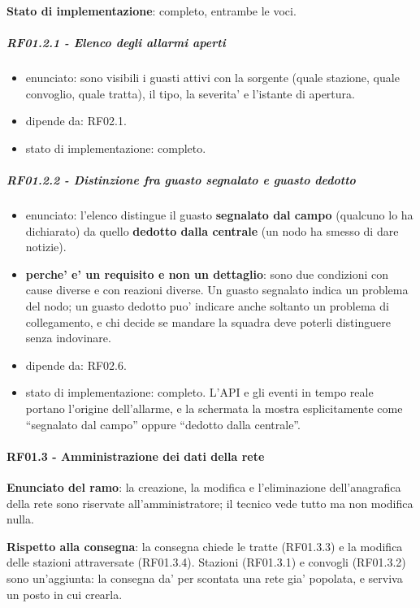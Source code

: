 \documentclass[11pt]{article}
\begin{document}
\textbf{Stato di implementazione}: completo, entrambe le voci.
\subparagraph{RF01.2.1 - Elenco degli allarmi aperti}
\label{sec:org7c5eade}
\begin{itemize}
\item enunciato: sono visibili i guasti attivi con la sorgente (quale stazione, quale convoglio, quale
tratta), il tipo, la severita' e l'istante di apertura.
\item dipende da: RF02.1.
\item stato di implementazione: completo.
\end{itemize}
\subparagraph{RF01.2.2 - Distinzione fra guasto segnalato e guasto dedotto}
\label{sec:org1d28290}
\begin{itemize}
\item enunciato: l'elenco distingue il guasto \textbf{segnalato dal campo} (qualcuno lo ha dichiarato) da quello
\textbf{dedotto dalla centrale} (un nodo ha smesso di dare notizie).
\item \textbf{perche' e' un requisito e non un dettaglio}: sono due condizioni con cause diverse e con reazioni
diverse. Un guasto segnalato indica un problema del nodo; un guasto dedotto puo' indicare anche
soltanto un problema di collegamento, e chi decide se mandare la squadra deve poterli distinguere
senza indovinare.
\item dipende da: RF02.6.
\item stato di implementazione: completo. L'API e gli eventi in tempo reale portano l'origine
dell'allarme, e la schermata la mostra esplicitamente come ``segnalato dal campo'' oppure
``dedotto dalla centrale''.
\end{itemize}
\paragraph{RF01.3 - Amministrazione dei dati della rete}
\label{sec:org2a15c73}

\textbf{Enunciato del ramo}: la creazione, la modifica e l'eliminazione dell'anagrafica della rete sono
riservate all'amministratore; il tecnico vede tutto ma non modifica nulla.

\textbf{Rispetto alla consegna}: la consegna chiede le tratte (RF01.3.3) e la modifica delle stazioni
attraversate (RF01.3.4). Stazioni (RF01.3.1) e convogli (RF01.3.2) sono un'aggiunta: la consegna da'
per scontata una rete gia' popolata, e serviva un posto in cui crearla.
\end{document}
